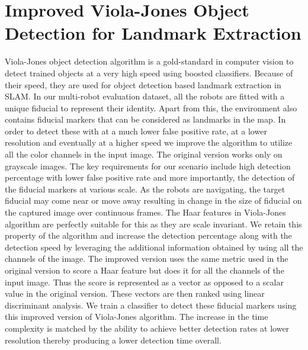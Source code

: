 \chapter{Improved Viola-Jones Object Detection for Landmark Extraction}
\label{chap:five}

Viola-Jones object detection algorithm \cite{violajones} is a gold-standard in computer vision to detect trained objects at a very high speed using boosted classifiers. Because of their speed, they are used for object detection based landmark extraction in SLAM. In our multi-robot evaluation dataset, all the robots are fitted with a unique fiducial to represent their identity. Apart from this, the environment also contains fiducial markers that can be considered as landmarks in the map. In order to detect these with at a much lower false positive rate, at a lower resolution and eventually at a higher speed we improve the algorithm to utilize all the color channels in the input image. The original version works only on grayscale images. The key requirements for our scenario include high detection percentage with lower false positive rate and more importantly, the detection of the fiducial markers at various scale. As the robots are navigating, the target fiducial may come near or move away resulting in change in the size of fiducial on the captured image over continuous frames. The Haar features in Viola-Jones algorithm are perfectly suitable for this as they are scale invariant. We retain this property of the algorithm and increase the detection percentage along with the detection speed by leveraging the additional information obtained by using all the channels of the image. The improved version uses the same metric used in the original version to score a Haar feature but does it for all the channels of the input image. Thus the score is represented as a vector as opposed to a scalar value in the original version. These vectors are then ranked using linear discriminant analysis. We train a classifier to detect these fiducial markers using this improved version of Viola-Jones algorithm. The increase in the time complexity is matched by the ability to achieve better detection rates at lower resolution thereby producing a lower detection time overall. 
